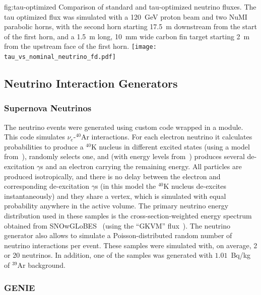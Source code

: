 \begin{dunefigure}{fig:tau-optimized}
{Comparison of standard and tau-optimized neutrino fluxes.  The tau optimized flux was simulated with a \SI{120}{\GeV} proton beam and two NuMI parabolic horns, with the second horn starting \SI{17.5}{m} 
downstream from the start of the first horn, and a \SI{1.5}{m} long, \SI{10}{mm} wide carbon fin target starting \SI{2}{m} from the upstream face of the first horn.  
}
\texttt{[image: tau\_vs\_nominal\_neutrino\_fd.pdf]}
\end{dunefigure}




\subsection{Neutrino Interaction Generators} 
\label{sec:tools-mc-gen}



\subsubsection{Supernova Neutrinos}

The  neutrino events were generated using custom code wrapped in a  module.
This code simulates  $\nu_e$-$^{40}$Ar interactions.
For each electron neutrino it calculates probabilities to produce a $^{40}$K nucleus
in different excited states (using a model from~\cite{Bhattacharya:1998hc}),
randomly selects one, and (with energy levels from~\cite{Cameron:2004myb}) 
produces several de-excitation $\gamma$s and an electron carrying the remaining energy.
All particles are produced isotropically, and 
there is no delay between the electron and corresponding de-excitation $\gamma$s
(in this model the $^{40}$K nucleus de-excites instantaneously) and they share a vertex,
which is simulated with equal probability anywhere in the active volume.
The primary neutrino energy distribution used in these samples is the cross-section-weighted 
energy spectrum obtained from SNOwGLoBES~\cite{snowglobes} (using the ``GKVM'' flux~\cite{GKVM}).
The  neutrino generator also allows to simulate a Poisson-distributed random number 
of neutrino interactions per event. These samples were simulated with, on average, 2 or 20 neutrinos.
In addition, one of the samples was generated with $1.01$~Bq/kg of $^{39}$Ar background.

\subsubsection{GENIE}

